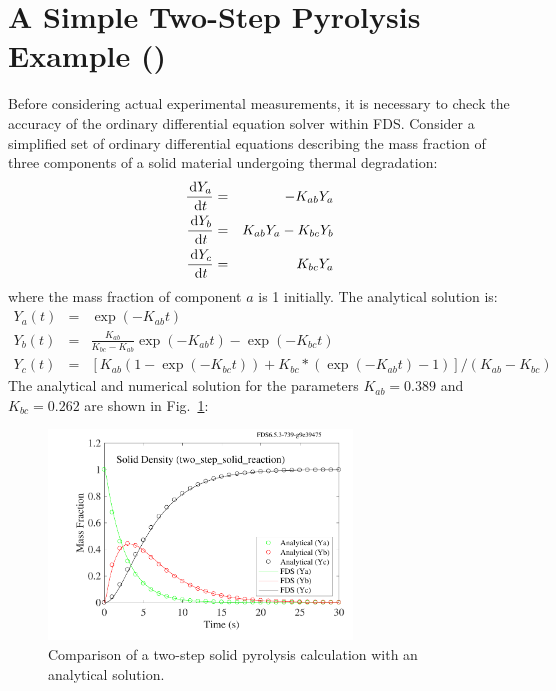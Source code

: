 \documentclass[11pt]{book}
\begin{document}
\section{A Simple Two-Step Pyrolysis Example (\texorpdfstring{}{two\_step\_solid\_reaction})}
\label{two_step_solid_reaction}

Before considering actual experimental measurements, it is necessary to check the accuracy of the ordinary differential
equation solver within FDS. Consider a simplified set  of ordinary  differential equations  describing the mass
fraction of three components of a solid material  undergoing thermal degradation:
\begin{eqnarray}
    \frac{\,\mathrm{d} Y_a}{\,\mathrm{d} t} &=&  -K_{ab} Y_a \nonumber  \\
    \frac{\,\mathrm{d} Y_b}{\,\mathrm{d} t} &=&   K_{ab} Y_a  -  K_{bc}  Y_b  \\
    \frac{\,\mathrm{d} Y_c}{\,\mathrm{d} t} &=&   K_{bc} Y_a
    \nonumber
\end{eqnarray}
where  the  mass  fraction  of  component  $a$  is  1  initially.  The
analytical solution is:
\begin{eqnarray}
    Y_a(t)    &=&    \exp(-K_{ab}t)    \nonumber   \\
    Y_b(t)    &=&    \frac{K_{ab}}{K_{bc}-K_{ab}} \exp(-K_{ab} t)  - \exp(-K_{bc} t) \\
    Y_c(t)    &=&    \left[   K_{ab}    (1-\exp(-K_{bc} t) )    +  K_{bc}*(\exp(-K_{ab} t) -1) \right] / (K_{ab}-K_{bc})
\end{eqnarray}
The analytical and  numerical solution for the parameters $K_{ab} = 0.389$ and $K_{bc} = 0.262$ are shown in Fig.~\ref{fig:two_step_solid_reaction}:

\begin{figure}[!htb]
\centering
\includegraphics[height=2.2in]{SCRIPT_FIGURES/two_step_solid_reaction}
\caption[The  test case]{Comparison of a two-step solid pyrolysis calculation with an analytical solution.}
\label{fig:two_step_solid_reaction}
\end{figure}
\end{document}

